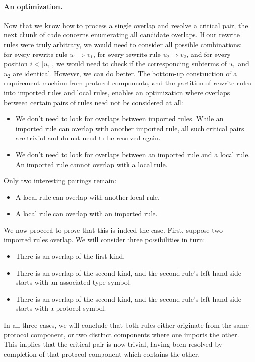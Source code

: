 \documentclass[../generics]{subfiles}
\begin{document}
\paragraph{An optimization.} 
Now that we know how to process a single overlap and resolve a critical pair, the next chunk of code concerns enumerating all candidate overlaps. If our rewrite rules were truly arbitrary, we would need to consider all possible combinations: for every rewrite rule $u_1\Rightarrow v_1$, for every rewrite rule $u_2\Rightarrow v_2$, and for every position $i<|u_1|$, we would need to check if the corresponding subterms of $u_1$ and $u_2$ are identical. However, we can do better. The bottom-up construction of a requirement machine from protocol components, and the partition of rewrite rules into imported rules and local rules, enables an optimization where overlaps between certain pairs of rules need not be considered at all:
\begin{itemize}
\item We don't need to look for overlaps between imported rules. While an imported rule can overlap with another imported rule, all such critical pairs are trivial and do not need to be resolved again.
\item We don't need to look for overlaps between an imported rule and a local rule. An imported rule cannot overlap with a local rule.
\end{itemize}
Only two interesting pairings remain:
\begin{itemize}
\item A local rule can overlap with another local rule.
\item A local rule can overlap with an imported rule.
\end{itemize}

We now proceed to prove that this is indeed the case. First, suppose two imported rules overlap. We will consider three possibilities in turn:
\begin{itemize}
\item There is an overlap of the first kind.
\item There is an overlap of the second kind, and the second rule's left-hand side starts with an associated type symbol.
\item There is an overlap of the second kind, and the second rule's left-hand side starts with a protocol symbol.
\end{itemize}
In all three cases, we will conclude that both rules either originate from the same protocol component, or two distinct components where one imports the other. This implies that the critical pair is now trivial, having been resolved by completion of that protocol component which contains the other.
\end{document}
